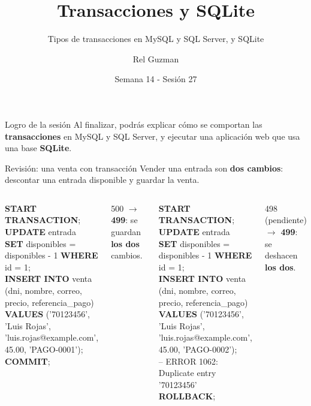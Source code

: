 \documentclass[aspectratio=169,10pt,c]{beamer}
\title{Transacciones y SQLite}
\subtitle{Tipos de transacciones en MySQL y SQL Server, y SQLite}
\date{Semana 14 - Sesión 27}
\author{Rel Guzman}
\newcommand{\kw}[1]{\textcolor{utpRojo}{\textbf{#1}}}
\newcommand{\etiqueta}[1]{\tikz[baseline=-0.5ex]{\node[rounded corners=2pt,fill=utpNegro,text=white,
  font=\bfseries\scriptsize,inner xsep=6pt,inner ysep=3pt] {#1};}}
\newcommand{\mal}[1]{{\setlength{\fboxsep}{1.2pt}\colorbox{utpRojo!18}{#1}}}
\newcommand{\dentro}[1]{{\setlength{\fboxsep}{1.5pt}\colorbox{yellow!45}{#1}}}
\newenvironment{sqlmini}[1][.86\textwidth]
  {\begin{center}\begin{lrbox}{\sqlbuf}\begin{minipage}{#1}\ttfamily\fontsize{7}{8.3}\selectfont\vspace{4pt}\raggedright}
  {\vspace{4pt}\end{minipage}\end{lrbox}\colorbox{utpGrisClaro}{\usebox{\sqlbuf}}\end{center}}
\newcommand{\col}{\dimexpr\textwidth-2\fboxsep\relax}
\newcommand{\ind}{\hspace*{1.2em}}
\newcommand{\err}[1]{\textcolor{utpRojo}{#1}}
\begin{document}
{\maketitle}
\begin{frame}[c]
\begin{block}{Logro de la sesión}
Al finalizar, podrás explicar cómo se comportan las \textbf{transacciones} en MySQL y SQL Server, y ejecutar una aplicación web que usa una base \textbf{SQLite}.
\end{block}
\end{frame}
\begin{frame}{Revisión: una venta con transacción}
\renewcommand{\arraystretch}{0.85}
\small Vender una entrada son \textbf{dos cambios}: descontar una entrada disponible y guardar la venta.
\vspace{0.15cm}
\begin{columns}[T,onlytextwidth]
\centering\etiqueta{La venta a Luis}
\begin{sqlmini}[\col]
\dentro{\kw{START TRANSACTION}};\\
\kw{UPDATE} entrada\\
\kw{SET} disponibles = disponibles - 1 \kw{WHERE} id = 1;\\
\kw{INSERT INTO} venta (dni, nombre, correo,\\
\ind precio, referencia\_pago)\\
\kw{VALUES} ('70123456', 'Luis Rojas',\\
\ind 'luis.rojas@example.com', 45.00, 'PAGO-0001');\\
\dentro{\kw{COMMIT}};
\end{sqlmini}
\small 500 $\rightarrow$ \textbf{499}: se guardan \textbf{los dos} cambios.
\centering\etiqueta{Luis otra vez}
\begin{sqlmini}[\col]
\dentro{\kw{START TRANSACTION}};\\
\kw{UPDATE} entrada\\
\kw{SET} disponibles = disponibles - 1 \kw{WHERE} id = 1;\\
\kw{INSERT INTO} venta (dni, nombre, correo,\\
\ind precio, referencia\_pago)\\
\kw{VALUES} (\mal{'70123456'}, 'Luis Rojas',\\
\ind 'luis.rojas@example.com', 45.00, 'PAGO-0002');\\
\err{-- ERROR 1062: Duplicate entry '70123456'}\\
\dentro{\kw{ROLLBACK}};
\end{sqlmini}
\small 498 (pendiente) $\rightarrow$ \textbf{499}: se deshacen \textbf{los dos}.
\end{columns}
\vspace{0.3cm}
\end{frame}
\end{document}
